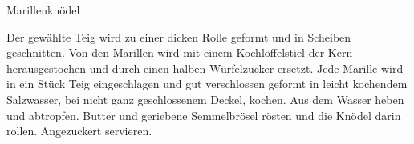 \begin{recipe}[\vegetarian]{Marillenknödel}
%
%
%
%
%

\begin{ingredients}
\end{ingredients}

\begin{instructions}
    Der gewählte Teig wird zu einer dicken Rolle geformt und in Scheiben geschnitten.
    Von den Marillen wird mit einem Kochlöffelstiel der Kern herausgestochen und durch einen halben Würfelzucker ersetzt.
    Jede Marille wird in ein Stück Teig eingeschlagen und gut verschlossen geformt in leicht kochendem Salzwasser, bei nicht ganz geschlossenem Deckel, kochen.
    Aus dem Wasser heben und abtropfen.
    Butter und geriebene Semmelbrösel rösten und die Knödel darin rollen.
    Angezuckert servieren.
\end{instructions}
\end{recipe}
